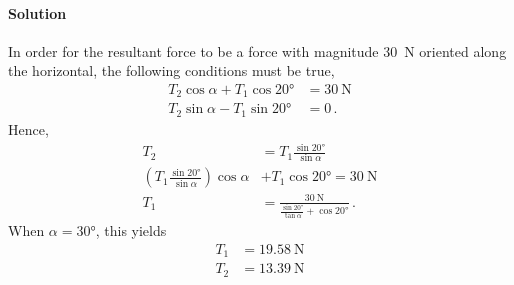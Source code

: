 \documentclass[a4paper,justified,oneside]{tufte-handout}
\numberwithin{equation}{subsection}
\begin{document}
\begin{solution}
\paragraph{Solution}
In order for the resultant force to be a force with magnitude \SI{30}{\N} oriented along the horizontal, the following conditions must be true,
\begin{align}
	T_2 \cos\alpha + T_1 \cos\ang{20} &= \SI{30}{\N}	\\
	T_2 \sin\alpha - T_1 \sin\ang{20} &= 0 \,.
\end{align}
Hence,
\begin{align}
	T_2	&=	T_1\frac{\sin\ang{20}}{\sin\alpha}	\label{A1:eq:Q3:T1}\\
	\left(	T_1 \frac{\sin\ang{20}}{\sin\alpha}	\right) \cos\alpha &+ T_1\cos\ang{20} = \SI{30}{\N}	\nonumber \\
	T_1	&=	\frac{\SI{30}{\N}}{\frac{\sin\ang{20}}{\tan\alpha} + \cos\ang{20}}	\,. \label{A1:eq:Q3:T2}
\end{align}
When $\alpha=\ang{30}$, this yields
\begin{align*}
	T_1&=\SI{19.58}{\N}\\
	T_2&=\SI{13.39}{\N}
\end{align*}


\end{solution}
\end{document}

